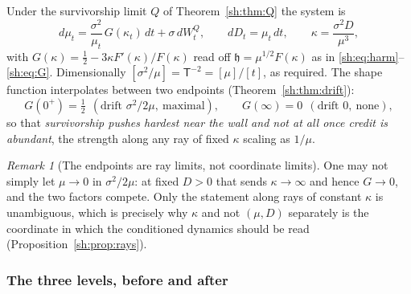 \documentclass[11pt]{article}
\numberwithin{equation}{section}
\theoremstyle{plain}
\theoremstyle{definition}
\theoremstyle{remark}
\newtheorem{remark}[theorem]{Remark}
\newcommand{\hm}{\mathfrak{h}}
\begin{document}
Under the survivorship limit $Q$ of Theorem~\ref{sh:thm:Q} the system is
\begin{equation}\label{sh:eq:sheet}
d\mu_t=\frac{\sigma^2}{\mu_t}\,G(\kappa_t)\,dt+\sigma\,dW^Q_t,
\qquad
dD_t=\mu_t\,dt,
\qquad
\kappa=\frac{\sigma^2D}{\mu^3},
\end{equation}
with $G(\kappa)=\tfrac12-3\kappa F'(\kappa)/F(\kappa)$ read off
$\hm=\mu^{1/2}F(\kappa)$ as in \eqref{sh:eq:harm}--\eqref{sh:eq:G}.
Dimensionally $[\sigma^2/\mu]=\mathsf T^{-2}=[\mu]/[t]$, as required. The
shape function interpolates between two endpoints
(Theorem~\ref{sh:thm:drift}):
\[
G(0^+)=\tfrac12\ \ (\text{drift }\sigma^2/2\mu,\ \text{maximal}),
\qquad
G(\infty)=0\ \ (\text{drift }0,\ \text{none}),
\]
so that \emph{survivorship pushes hardest near the wall and not at all
once credit is abundant}, the strength along any ray of fixed $\kappa$
scaling as $1/\mu$.

\begin{remark}[The endpoints are ray limits, not coordinate limits]
\label{sh:rem:raylimit}
One may not simply let $\mu\to0$ in $\sigma^2/2\mu$: at fixed $D>0$ that
sends $\kappa\to\infty$ and hence $G\to0$, and the two factors compete.
Only the statement along rays of constant $\kappa$ is unambiguous, which
is precisely why $\kappa$ and not $(\mu,D)$ separately is the coordinate
in which the conditioned dynamics should be read
(Proposition~\ref{sh:prop:rays}).
\end{remark}

\subsubsection{The three levels, before and after}
\label{sh:subsub:sheet:levels}
\end{document}
